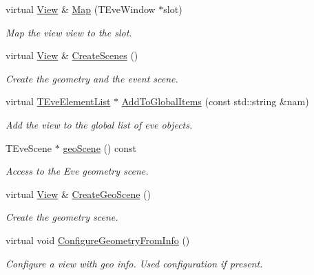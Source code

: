 \begin{DoxyCompactItemize}
virtual \hyperlink{class_d_d4hep_1_1_view}{View} \& \hyperlink{class_d_d4hep_1_1_view_a570467ad2be3126bca9aa3563338bcd2}{Map} (TEveWindow $\ast$slot)
\begin{DoxyCompactList}\small\item\em Map the view view to the slot. \item\end{DoxyCompactList}\item 
virtual \hyperlink{class_d_d4hep_1_1_view}{View} \& \hyperlink{class_d_d4hep_1_1_view_a6c2c1c89a0ad7c6a75379103f8523fdc}{CreateScenes} ()
\begin{DoxyCompactList}\small\item\em Create the geometry and the event scene. \item\end{DoxyCompactList}\item 
virtual \hyperlink{class_t_eve_element_list}{TEveElementList} $\ast$ \hyperlink{class_d_d4hep_1_1_view_afd4a5a254c13a5cec6a4157cacfaabe3}{AddToGlobalItems} (const std::string \&nam)
\begin{DoxyCompactList}\small\item\em Add the view to the global list of eve objects. \item\end{DoxyCompactList}\item 
TEveScene $\ast$ \hyperlink{class_d_d4hep_1_1_view_ab95a0aba3fabd1d16496e000ee95a64e}{geoScene} () const 
\begin{DoxyCompactList}\small\item\em Access to the Eve geometry scene. \item\end{DoxyCompactList}\item 
virtual \hyperlink{class_d_d4hep_1_1_view}{View} \& \hyperlink{class_d_d4hep_1_1_view_a8738a88e61d962553fe86472b294028b}{CreateGeoScene} ()
\begin{DoxyCompactList}\small\item\em Create the geometry scene. \item\end{DoxyCompactList}\item 
virtual void \hyperlink{class_d_d4hep_1_1_view_af573f4aceff18a93fd91b2678de0ae8e}{ConfigureGeometryFromInfo} ()
\begin{DoxyCompactList}\small\item\em Configure a view with geo info. Used configuration if present. \item\end{DoxyCompactList}\item 

\end{DoxyCompactItemize}
